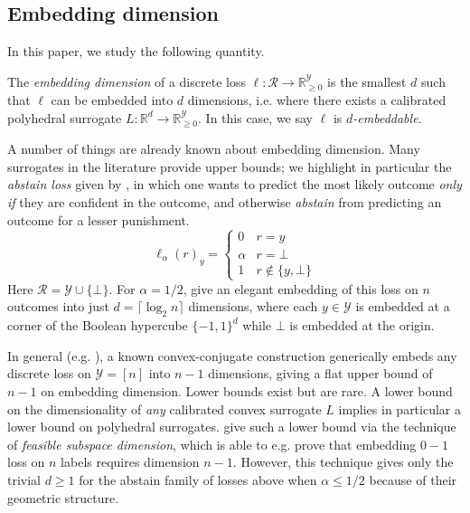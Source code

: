 \documentclass[anon]{colt2020} %
\newcommand{\reals}{\mathbb{R}}
\newcommand{\nonnegreals}{\reals_{\geq 0}}%
\newcommand{\R}{\mathcal{R}}
\newcommand{\Y}{\mathcal{Y}}
\newcommand{\ellabs}[1]{\ell_{#1}}
\begin{document}
\subsection{Embedding dimension}

In this paper, we study the following quantity.
\begin{definition}
  The \emph{embedding dimension} of a discrete loss $\ell: \R \to \nonnegreals^{\Y}$ is the smallest $d$ such that $\ell$ can be embedded into $d$ dimensions, i.e. where there exists a calibrated polyhedral surrogate $L: \reals^d \to \nonnegreals^{\Y}$.
  In this case, we say $\ell$ is \emph{$d$-embeddable}.
\end{definition}

A number of things are already known about embedding dimension.
Many surrogates in the literature provide upper bounds; we highlight in particular the \emph{abstain loss} given by \cite{ramaswamy2018consistent}, in which one wants to predict the most likely outcome \emph{only if} they are confident in the outcome, and otherwise \emph{abstain} from predicting an outcome for a lesser punishment. 
\begin{equation}\label{eq:abstain}
\ellabs{\alpha}(r)_y = \begin{cases}
0 & r = y\\
\alpha & r = \bot\\
1 & r \not \in \{y, \bot\}
\end{cases}
\end{equation}
Here $\R = \Y \cup \{\bot\}$.
For $\alpha=1/2$, \cite{ramaswamy2018consistent} give an elegant embedding of this loss on $n$ outcomes into just $d = \lceil \log_2 n \rceil$ dimensions, where each $y \in \Y$ is embedded at a corner of the Boolean hypercube $\{-1,1\}^d$ while $\bot$ is embedded at the origin.

In general (e.g. \cite{finocchiaro2019embedding}), a known convex-conjugate construction generically embeds any discrete loss on $\Y = [n]$ into $n-1$ dimensions, giving a flat upper bound of $n-1$ on embedding dimension.
Lower bounds exist but are rare.
A lower bound on the dimensionality of \emph{any} calibrated convex surrogate $L$ implies in particular a lower bound on polyhedral surrogates. 
\cite{ramaswamy2016convex} give such a lower bound via the technique of \emph{feasible subspace dimension}, which is able to e.g. prove that embedding $0-1$ loss on $n$ labels requires dimension $n-1$.
However, this technique gives only the trivial $d \geq 1$ for the abstain family of losses above when $\alpha \leq 1/2$ because of their geometric structure.
\end{document}
